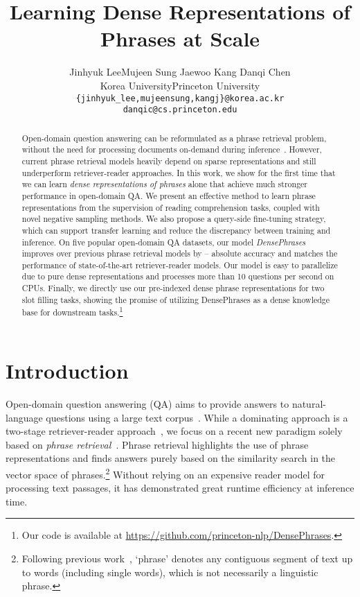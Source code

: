 \documentclass[11pt,a4paper]{article}
\title{Learning Dense Representations of Phrases at Scale}
\author{
  Jinhyuk Lee\Thanks{ Work partly done while visiting Princeton University.}\quad Mujeen Sung \quad Jaewoo Kang \quad Danqi Chen\\
  Korea University\quad Princeton University\\
  \texttt{\{jinhyuk\_lee,mujeensung,kangj\}@korea.ac.kr} \\
  \texttt{danqic@cs.princeton.edu} \\}
\date{}
\newcommand\ti[1]{\textit{#1}}
\begin{document}
\maketitle



\begin{abstract}
Open-domain question answering can be reformulated as a phrase retrieval problem, without the need for processing documents on-demand during inference~\citep{seo2019real}.
However, current phrase retrieval models heavily depend on sparse representations and still underperform retriever-reader approaches.
In this work, we show for the first time that we can learn \ti{dense representations of phrases} alone that achieve much stronger performance in open-domain QA.
We present an effective method to learn phrase representations from the supervision of reading comprehension tasks, coupled with novel negative sampling methods.
We also propose a query-side fine-tuning strategy, which can support transfer learning and reduce the discrepancy between training and inference.
On five popular open-domain QA datasets, our model \ti{DensePhrases} improves over previous phrase retrieval models by -- absolute accuracy and matches the performance of state-of-the-art retriever-reader models.
Our model is easy to parallelize due to pure dense representations and processes more than 10 questions per second on CPUs.
Finally, we directly use our pre-indexed dense phrase representations for two slot filling tasks, showing the promise of utilizing {DensePhrases} as a dense knowledge base for downstream tasks.\footnote{Our code is available at \url{https://github.com/princeton-nlp/DensePhrases}.}


\end{abstract}
 

\section{Introduction}
\label{sec:intro}

Open-domain question answering (QA) aims to provide answers to natural-language questions using a large text corpus~\citep{voorhees1999trec,ferrucci2010building,chen2020open}.
While a dominating approach is a two-stage retriever-reader approach~\citep{chen2017reading,lee2019latent,guu2020realm,karpukhin2020dense},
we focus on a recent new paradigm solely based on \textit{phrase retrieval}~\citep{seo2019real,lee2020contextualized}.
Phrase retrieval highlights the use of phrase representations and finds answers purely based on the similarity search in the vector space of phrases.\footnote{Following previous work~\citep{seo2018phrase}, `phrase' denotes any contiguous segment of text up to  words (including single words), which is not necessarily a linguistic phrase.}
Without relying on an expensive reader model for processing text passages, it has demonstrated great runtime efficiency at inference time.
\end{document}
